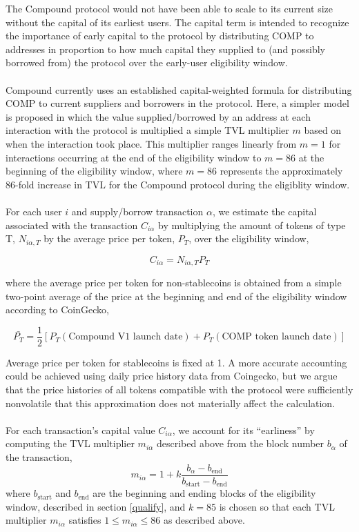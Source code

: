\documentclass[12pt]{article}
\begin{document}
The Compound protocol would not have been able to scale to its current size without
the capital of its earliest users. The capital term is intended to recognize the
importance of early capital to the protocol by distributing COMP to addresses in
proportion to how much capital they supplied to (and possibly borrowed from) the
protocol over the early-user eligibility window.
\\\\
Compound currently uses an established capital-weighted formula for distributing
COMP to current suppliers and borrowers in the protocol. Here, a simpler model is
proposed in which the value supplied/borrowed by an address at each interaction
with the protocol is multiplied a simple TVL multiplier $m$ based on
when the interaction took place. This multiplier ranges linearly from $m = 1$
for interactions occurring at the end of the eligibility window to $m = 86$ at the
beginning of the eligibility window, where $m = 86$ represents the approximately 86-fold
increase in TVL for the Compound protocol during the eligiblity window.
\\\\
For each user $i$ and supply/borrow transaction $\alpha$, we estimate the capital
associated with the transaction $C_{i\alpha}$ by multiplying the amount of tokens
of type T, $N_{i\alpha,T}$ by the average price per token, $P_T$, over the eligibility window,

\begin{equation*}
  C_{i\alpha} = N_{i\alpha,T}P_T
\end{equation*}

where the average price per token for non-stablecoins is obtained from a simple two-point average
of the price at the beginning and end of the eligibility window according to CoinGecko,

\begin{equation*}
  \bar{P_T} = \frac{1}{2}\left[P_T(\textrm{Compound V1 launch date}) + P_T(\textrm{COMP token launch date})\right]
\end{equation*}

Average price per token for stablecoins is fixed at 1. 
A more accurate accounting could be achieved using daily price history data from Coingecko,
but we argue that the price histories of all tokens compatible with the protocol were
sufficiently nonvolatile that this approximation does not materially affect the calculation.
\\\\
For each transaction's capital value $C_{i\alpha}$, we account for its ``earliness'' by
computing the TVL multiplier $m_{i\alpha}$ described above from the block number $b_{\alpha}$ of the transaction,
\begin{equation*}
  m_{i\alpha} = 1 + k\frac{b_{\alpha} - b_{\textrm{end}}}
                     {b_{\textrm{start}}-b_{\textrm{end}}}
\end{equation*}
where $b_{\textrm{start}}$ and $b_{\textrm{end}}$ are the beginning and ending blocks of the
eligibility window, described in section \ref{qualify}, and $k=85$ is chosen so that each TVL
multiplier $m_{i\alpha}$ satisfies $1 \leq m_{i\alpha} \leq 86$ as described above.
\end{document}
